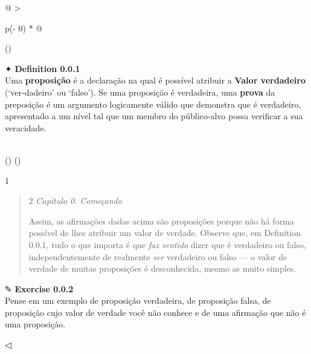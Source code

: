 \documentclass[
]{article}
\begin{document}
\begin{longtable}[]{@{}
  >{\raggedright\arraybackslash}p{(\columnwidth - 0\tabcolsep) * }@{}}
\toprule()
\begin{minipage}[b]{\linewidth}\raggedright
✦ \textbf{Definition 0.0.1}\\
Uma \textbf{proposição} é a declaração na qual é possível atribuir a
\textbf{Valor verdadeiro} (`ver-dadeiro' ou `falso'). Se uma proposição
é verdadeira, uma \textbf{prova} da preposição é um argumento
logicamente válido que demonstra que é verdadeiro, apresentado a um
nível tal que um membro do público-alvo possa verificar a sua
veracidade.\strut
\end{minipage} \\
\midrule()
\endhead
\bottomrule()
\end{longtable}

1

\begin{quote}
2 \emph{Capítulo 0. Começando}

Assim, as afirmações dadas acima são proposições porque não há forma
possível de lhes atribuir um valor de verdade. Observe que, em
Definition 0.0.1, tudo o que importa é que \emph{faz sentido} dizer que
é verdadeiro ou falso, independentemente de realmente \emph{ser}
verdadeiro ou falso --- o valor de verdade de muitas proposições é
desconhecida, mesmo as muito simples.
\end{quote}

✎ \textbf{Exercise 0.0.2}\\
Pense em um exemplo de proposição verdadeira, de proposição falsa, de
proposição cujo valor de verdade você não conhece e de uma afirmação que
não é uma proposição.

◁
\end{document}
